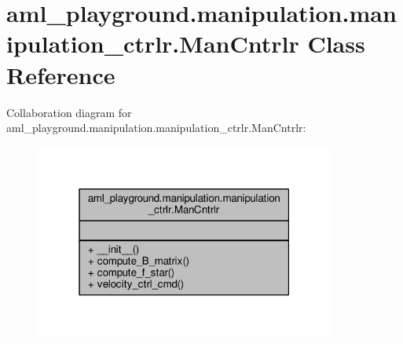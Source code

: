 \hypertarget{classaml__playground_1_1manipulation_1_1manipulation__ctrlr_1_1_man_cntrlr}{\section{aml\-\_\-playground.\-manipulation.\-manipulation\-\_\-ctrlr.\-Man\-Cntrlr Class Reference}
\label{classaml__playground_1_1manipulation_1_1manipulation__ctrlr_1_1_man_cntrlr}
}


Collaboration diagram for aml\-\_\-playground.\-manipulation.\-manipulation\-\_\-ctrlr.\-Man\-Cntrlr\-:
\nopagebreak
\begin{figure}[H]
\begin{center}
\leavevmode
\includegraphics[width=280pt]{classaml__playground_1_1manipulation_1_1manipulation__ctrlr_1_1_man_cntrlr__coll__graph}
\end{center}
\end{figure}
